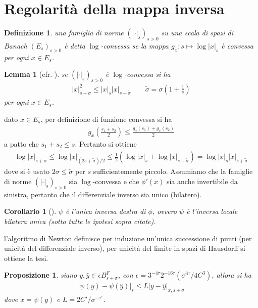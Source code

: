 \documentclass[twoside, 11pt]{amsbook}
\makeatletter
\newcommand{\0}{{(0)}}
\newcommand{\3}{{(3)}}
\theoremstyle{colonplain}
\newtheorem{prop}[thm]{Proposizione}
\newtheorem{lemma}[thm]{Lemma}
\newtheorem{cor}[thm]{Corollario}
\theoremstyle{colondefinition}
\newtheorem{defn}[thm]{Definizione}
\theoremstyle{colonremark}
\numberwithin{equation}{chapter}
\renewcommand{\proofname}{Dimostrazione}
\renewenvironment{proof}[1][\proofname]{\par
  \pushQED{\qed}%
  \normalfont \topsep6\p@\@plus6\p@\relax
  \trivlist
  \item[\hskip\labelsep\bfseries #1:]\ignorespaces
}{%
  \popQED\endtrivlist\@endpefalse
}
\makeatother
\begin{document}
\section{Regolarità della mappa inversa}
\begin{defn} una famiglia di norme $(|\cdot|_s)_{s > 0}$ su una scala di spazi di Banach $(E_s)_{s > 0}$ è detta $\log$-convessa se la mappa $g_x : s \mapsto \log |x|_s$ è convessa per ogni $x \in E_s$.
\end{defn}
\begin{lemma}[cfr. \cite{Massetti}] se $(|\cdot|_s)_{s > 0}$ è $\log$-convessa si ha
\begin{align}
    |x|^2_{s + \sigma} \leq |x|_s|x|_{s + \widetilde{\sigma}} \qquad \widetilde{\sigma} = \sigma\left(1 + \frac{1}{s}\right) 
\end{align}
per ogni $x \in E_s$.
\end{lemma}

\begin{proof} dato $x \in E_s$, per definizione di funzione convessa si ha
\begin{align}
    g_x\left(\frac{s_1 + s_2}{2}\right) \leq \frac{g_x(s_1) + g_x(s_2)}{2}
\end{align}
a patto che $s_1 + s_2 \leq s$. Pertanto si ottiene
\begin{align}
    \log |x|_{s + \sigma} \leq \log |x|_{(2s + \widetilde{\sigma})/2} \leq \frac{1}{2}(\log |x|_s + \log |x|_{s + \widetilde{\sigma}}) = \log |x|_s|x|_{s + \widetilde{\sigma}} 
\end{align}
dove si è usato $2\sigma \leq \widetilde{\sigma}$ per $s$ sufficientemente piccolo.
\end{proof}
Assumiamo che la famiglie di norme $(|\cdot|_s)_{s > 0}$ sia $\log$-convessa e che $\phi'(x)$ sia anche invertibile da sinistra, pertanto che il differenziale inverso sia unico (bilatero).
\begin{cor}[\cite{Massetti}] $\psi$ è l'unica inversa destra di $\phi$, ovvero $\psi$ è l'inversa locale bilatera unica (sotto tutte le ipotesi sopra citate).
\end{cor}

\begin{proof} l'algoritmo di Newton definisce per induzione un'unica successione di punti (per unicità del differenziale inverso), per unicità del limite in spazi di Hausdorff si ottiene la tesi.
\end{proof}
\begin{prop}\label{LipschCont}\cite{Massetti} siano $y, \hat{y} \in \epsilon B^F_{s + \sigma}$, con $\epsilon = 3^{-4\tau}2^{-16\tau}(\sigma^{6\tau}/4C^3)$, allora si ha
\begin{align}
    |\psi(y) - \psi(\hat{y})|_{s} \leq L|y - \hat{y}|_{x, s + \sigma} 
\end{align}
dove $x = \psi(y)$ e $L = 2C'/\sigma^{-\tau'}$.
\end{prop}
\end{document}
